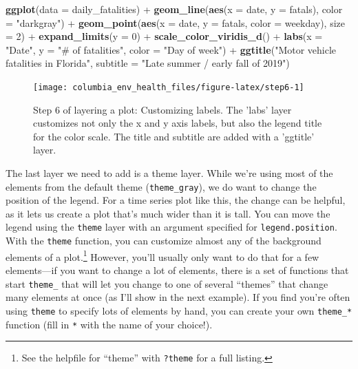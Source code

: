 \documentclass[]{tufte-book}
\newenvironment{Shaded}{}{}
\newcommand{\DataTypeTok}[1]{\textcolor[rgb]{0.56,0.13,0.00}{#1}}
\newcommand{\DecValTok}[1]{\textcolor[rgb]{0.25,0.63,0.44}{#1}}
\newcommand{\KeywordTok}[1]{\textcolor[rgb]{0.00,0.44,0.13}{\textbf{#1}}}
\newcommand{\NormalTok}[1]{#1}
\newcommand{\OperatorTok}[1]{\textcolor[rgb]{0.40,0.40,0.40}{#1}}
\newcommand{\StringTok}[1]{\textcolor[rgb]{0.25,0.44,0.63}{#1}}
\begin{document}
\begin{Shaded}
\begin{Highlighting}[]
\KeywordTok{ggplot}\NormalTok{(}\DataTypeTok{data =}\NormalTok{ daily_fatalities) }\OperatorTok{+}\StringTok{ }\KeywordTok{geom_line}\NormalTok{(}\KeywordTok{aes}\NormalTok{(}\DataTypeTok{x =}\NormalTok{ date, }
    \DataTypeTok{y =}\NormalTok{ fatals), }\DataTypeTok{color =} \StringTok{"darkgray"}\NormalTok{) }\OperatorTok{+}\StringTok{ }\KeywordTok{geom_point}\NormalTok{(}\KeywordTok{aes}\NormalTok{(}\DataTypeTok{x =}\NormalTok{ date, }
    \DataTypeTok{y =}\NormalTok{ fatals, }\DataTypeTok{color =}\NormalTok{ weekday), }\DataTypeTok{size =} \DecValTok{2}\NormalTok{) }\OperatorTok{+}\StringTok{ }
\StringTok{    }\KeywordTok{expand_limits}\NormalTok{(}\DataTypeTok{y =} \DecValTok{0}\NormalTok{) }\OperatorTok{+}\StringTok{ }\KeywordTok{scale_color_viridis_d}\NormalTok{() }\OperatorTok{+}\StringTok{ }
\StringTok{    }\KeywordTok{labs}\NormalTok{(}\DataTypeTok{x =} \StringTok{"Date"}\NormalTok{, }\DataTypeTok{y =} \StringTok{"# of fatalities"}\NormalTok{, }\DataTypeTok{color =} \StringTok{"Day of week"}\NormalTok{) }\OperatorTok{+}\StringTok{ }
\StringTok{    }\KeywordTok{ggtitle}\NormalTok{(}\StringTok{"Motor vehicle fatalities in Florida"}\NormalTok{, }
        \DataTypeTok{subtitle =} \StringTok{"Late summer / early fall of 2019"}\NormalTok{)}
\end{Highlighting}
\end{Shaded}

\begin{figure}
\texttt{[image: columbia\_env\_health\_files/figure-latex/step6-1]} \caption[Step 6 of layering a plot]{Step 6 of layering a plot: Customizing labels. The 'labs' layer customizes not only the x and y axis labels, but also the legend title for the color scale. The title and subtitle are added with a 'ggtitle' layer.}\label{fig:step6}
\end{figure}

The last layer we need to add is a theme layer. While we're using most of the
elements from the default theme (\texttt{theme\_gray}), we do want to change the position
of the legend. For a time series plot like this, the change can be helpful, as it
lets us create a plot that's much wider than it is tall. You can move the legend
using the \texttt{theme} layer with an argument specified for \texttt{legend.position}. With
the \texttt{theme} function, you can customize almost any of the background elements of a
plot.\footnote{See the helpfile for ``theme'' with \texttt{?theme} for a full listing.}
However, you'll usually only want to do that for a few elements---if you want
to change a lot of elements, there is a set of functions that start \texttt{theme\_} that
will let you change to one of several ``themes'' that change many elements at once
(as I'll show in the next example).
If you find you're often using \texttt{theme} to specify lots of elements by hand, you
can create your own \texttt{theme\_*} function (fill in \texttt{*} with the name of your choice!).
\end{document}
